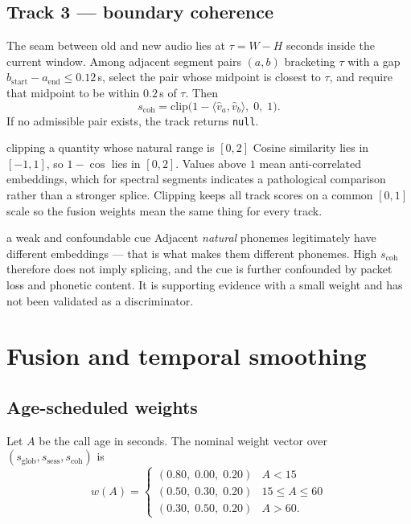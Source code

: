 \documentclass[11pt,a4paper]{article}
\newcommand{\code}[1]{\texttt{\small #1}}
\newcommand{\unitvec}[1]{\widehat{#1}}
\begin{document}
\subsection{Track 3 --- boundary coherence}

The seam between old and new audio lies at $\tau = W - H$ seconds inside the current
window. Among adjacent segment pairs $(a,b)$ bracketing $\tau$ with a gap
$b_{\text{start}} - a_{\text{end}} \le 0.12$\,s, select the pair whose midpoint is
closest to $\tau$, and require that midpoint to be within $0.2$\,s of $\tau$. Then
\begin{equation}
s_{\mathrm{coh}} = \mathrm{clip}\big(1 - \langle \unitvec{v}_a, \unitvec{v}_b \rangle,\; 0,\; 1\big).
\end{equation}
If no admissible pair exists, the track returns \code{null}.

\begin{whybox}{clipping a quantity whose natural range is $[0,2]$}
Cosine similarity lies in $[-1,1]$, so $1-\cos$ lies in $[0,2]$. Values above $1$ mean
anti-correlated embeddings, which for spectral segments indicates a pathological
comparison rather than a stronger splice. Clipping keeps all track scores on a common
$[0,1]$ scale so the fusion weights mean the same thing for every track.
\end{whybox}

\begin{warnbox}{a weak and confoundable cue}
Adjacent \emph{natural} phonemes legitimately have different embeddings --- that is what
makes them different phonemes. High $s_{\mathrm{coh}}$ therefore does not imply
splicing, and the cue is further confounded by packet loss and phonetic content. It is
supporting evidence with a small weight and has not been validated as a discriminator.
\end{warnbox}

\section{Fusion and temporal smoothing}

\subsection{Age-scheduled weights}

Let $A$ be the call age in seconds. The nominal weight vector over
$(s_{\mathrm{glob}}, s_{\mathrm{sess}}, s_{\mathrm{coh}})$ is
\begin{equation}
w(A) = \begin{cases}
(0.80,\; 0.00,\; 0.20) & A < 15\\
(0.50,\; 0.30,\; 0.20) & 15 \le A \le 60\\
(0.30,\; 0.50,\; 0.20) & A > 60 .
\end{cases}
\end{equation}
\end{document}
